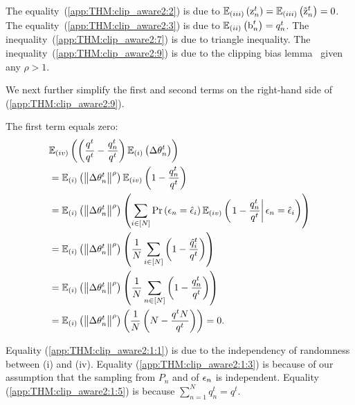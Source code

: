 The equality~(\ref{app:THM:clip_aware2:2}) is due to $\mathbb{E}_{(iii)}\left({{\textnormal{z}}_n^t}\right)=\mathbb{E}_{(iii)}\left({\tilde{{\textnormal{z}}}_n^t}\right)=0$. The equality~(\ref{app:THM:clip_aware2:3}) is due to $\mathbb{E}_{(ii)}\left({{\textnormal{b}}_n^t}\right)=q_n^t$. The inequality~(\ref{app:THM:clip_aware2:7}) is due to triangle inequality. The inequality~(\ref{app:THM:clip_aware2:9}) is due to the clipping bias lemma~\citep{das2023beyond} given any $\rho>1$.

We next further simplify the first and second terms on the right-hand side of (\ref{app:THM:clip_aware2:9}).

The first term equals zero:
\begin{align}
&\mathbb{E}_{(iv)}\left({ \left(\frac{q^t}{q^t} - \frac{q_n^t}{q^t}\right)\mathbb{E}_{(i)}\left({{\Delta {\theta}_n^t}}\right)}\right) \nonumber
\\
&= \mathbb{E}_{(i)}\left({\left\|{\Delta {\theta}_n^t}\right\|^{\rho}}\right)\mathbb{E}_{(iv)}\left({1 - \frac{q_n^t}{q^t}}\right)
\label{app:THM:clip_aware2:1:1}
\\
&= \mathbb{E}_{(i)}\left({\left\|{\Delta {\theta}_n^t}\right\|^{\rho}}\right)\left(\sum_{i\in [N]} \text{Pr}\left({\epsilon}_n=\hat{{\epsilon}}_i\right)\mathbb{E}_{(iv)}\left({\left.1 - \frac{q_n^t}{q^t}\right| {\epsilon}_n=\hat{{\epsilon}}_i}\right)\right)
\label{app:THM:clip_aware2:1:2}
\\
&=\mathbb{E}_{(i)}\left({\left\|{\Delta {\theta}_n^t}\right\|^{\rho}}\right)\left(\frac{1}{N}\sum_{i\in [N]}\left(1 - \frac{\hat{q}_i^t}{q^t} \right) \right)
\label{app:THM:clip_aware2:1:3}
\\&=\mathbb{E}_{(i)}\left({\left\|{\Delta {\theta}_n^t}\right\|^{\rho}}\right)\left(\frac{1}{N}\sum_{n\in [N]}\left(1 - \frac{q_n^t}{q^t} \right) \right)\label{app:THM:clip_aware2:1:4}
\\
&=
\mathbb{E}_{(i)}\left({\left\|{\Delta {\theta}_n^t}\right\|^{\rho}}\right)\left(\frac{1}{N}\left(N - \frac{q^tN}{q^t} \right) \right) = 0.\label{app:THM:clip_aware2:1:5}
\end{align}

Equality (\ref{app:THM:clip_aware2:1:1}) is due to the independency of randomness between (i) and (iv). Equality (\ref{app:THM:clip_aware2:1:3}) is because of our assumption that the sampling from $P_n$ and of ${\epsilon}_n$ is independent. Equality (\ref{app:THM:clip_aware2:1:5}) is because $\sum_{n=1}^N q_n^t = q^t$.

